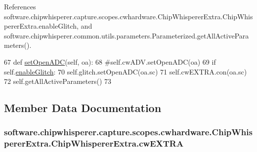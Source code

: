 References software.\+chipwhisperer.\+capture.\+scopes.\+cwhardware.\+Chip\+Whisperer\+Extra.\+Chip\+Whisperer\+Extra.\+enable\+Glitch, and software.\+chipwhisperer.\+common.\+utils.\+parameters.\+Parameterized.\+get\+All\+Active\+Parameters().


\begin{DoxyCode}
67     \textcolor{keyword}{def }\hyperlink{classsoftware_1_1chipwhisperer_1_1capture_1_1scopes_1_1cwhardware_1_1ChipWhispererExtra_1_1ChipWhispererExtra_a1dbd009f74e8175320881f0574f57eee}{setOpenADC}(self, oa):
68         \textcolor{comment}{#self.cwADV.setOpenADC(oa)}
69         \textcolor{keywordflow}{if} self.\hyperlink{classsoftware_1_1chipwhisperer_1_1capture_1_1scopes_1_1cwhardware_1_1ChipWhispererExtra_1_1ChipWhispererExtra_a1188cd109054d98e8a7d82a6e13cb885}{enableGlitch}:
70             self.glitch.setOpenADC(oa.sc)
71         self.cwEXTRA.con(oa.sc)
72         self.getAllActiveParameters()
73 
\end{DoxyCode}


\subsection{Member Data Documentation}
\hypertarget{classsoftware_1_1chipwhisperer_1_1capture_1_1scopes_1_1cwhardware_1_1ChipWhispererExtra_1_1ChipWhispererExtra_a55082cef3d758f5300a2940213bf3587}{}
\subsubsection[{cw\+E\+X\+T\+R\+A}]{\setlength{\rightskip}{0pt plus 5cm}software.\+chipwhisperer.\+capture.\+scopes.\+cwhardware.\+Chip\+Whisperer\+Extra.\+Chip\+Whisperer\+Extra.\+cw\+E\+X\+T\+R\+A}\label{classsoftware_1_1chipwhisperer_1_1capture_1_1scopes_1_1cwhardware_1_1ChipWhispererExtra_1_1ChipWhispererExtra_a55082cef3d758f5300a2940213bf3587}
\hypertarget{classsoftware_1_1chipwhisperer_1_1capture_1_1scopes_1_1cwhardware_1_1ChipWhispererExtra_1_1ChipWhispererExtra_a1188cd109054d98e8a7d82a6e13cb885}{}
